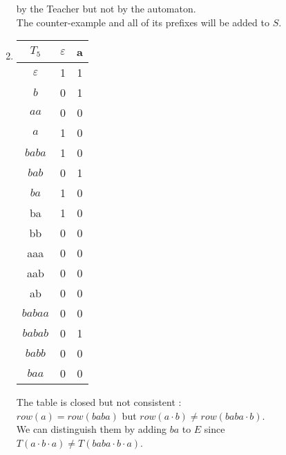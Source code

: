 \begin{enumerate}
\begin{center}
\begin{minipage}{0.5\textwidth}
            by the Teacher but not by the automaton.\\
            The counter-example and all of its prefixes will be added to $S$.
          \end{minipage}
        \end{center}
  \item \quad
        \begin{center}
          \begin{tabular}{c || c | c }
            $T_5$         & $\varepsilon$ & a \\ [0.5ex]
            \hline\hline
            $\varepsilon$ & 1             & 1 \\
            $b$           & 0             & 1 \\
            $aa$          & 0             & 0 \\
            $a$           & 1             & 0 \\
            $baba$        & 1             & 0 \\
            $bab$         & 0             & 1 \\
            $ba$          & 1             & 0 \\
            \hline \hline
            ba            & 1             & 0 \\
            bb            & 0             & 0 \\
            aaa           & 0             & 0 \\
            aab           & 0             & 0 \\
            ab            & 0             & 0 \\
            $babaa$       & 0             & 0 \\
            $babab$       & 0             & 1 \\
            $babb$        & 0             & 0 \\
            $baa$         & 0             & 0 \\
          \end{tabular}
          \quad
          \begin{minipage}{0.5\textwidth}
            The table is closed but not consistent :\\
            $row(a) = row(baba)$ but $row(a \cdot b) \neq row(baba \cdot b)$.\\
            We can distinguish them by adding $ba$ to $E$ since $T(a \cdot b \cdot a) \neq T(baba \cdot b \cdot a)$. \\

\end{minipage}
\end{center}
\end{enumerate}
